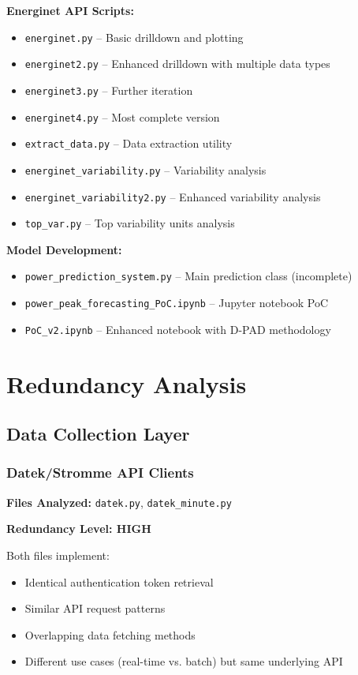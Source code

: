 \documentclass[11pt,a4paper]{article}
\begin{document}
\textbf{Energinet API Scripts:}
\begin{itemize}
    \item \texttt{energinet.py} -- Basic drilldown and plotting
    \item \texttt{energinet2.py} -- Enhanced drilldown with multiple data types
    \item \texttt{energinet3.py} -- Further iteration
    \item \texttt{energinet4.py} -- Most complete version
    \item \texttt{extract\_data.py} -- Data extraction utility
    \item \texttt{energinet\_variability.py} -- Variability analysis
    \item \texttt{energinet\_variability2.py} -- Enhanced variability analysis
    \item \texttt{top\_var.py} -- Top variability units analysis
\end{itemize}

\textbf{Model Development:}
\begin{itemize}
    \item \texttt{power\_prediction\_system.py} -- Main prediction class (incomplete)
    \item \texttt{power\_peak\_forecasting\_PoC.ipynb} -- Jupyter notebook PoC
    \item \texttt{PoC\_v2.ipynb} -- Enhanced notebook with D-PAD methodology
\end{itemize}

\section{Redundancy Analysis}

\subsection{Data Collection Layer}

\subsubsection{Datek/Stromme API Clients}

\textbf{Files Analyzed:} \texttt{datek.py}, \texttt{datek\_minute.py}

\textbf{Redundancy Level: HIGH}

Both files implement:
\begin{itemize}
    \item Identical authentication token retrieval
    \item Similar API request patterns
    \item Overlapping data fetching methods
    \item Different use cases (real-time vs. batch) but same underlying API
\end{itemize}
\end{document}
